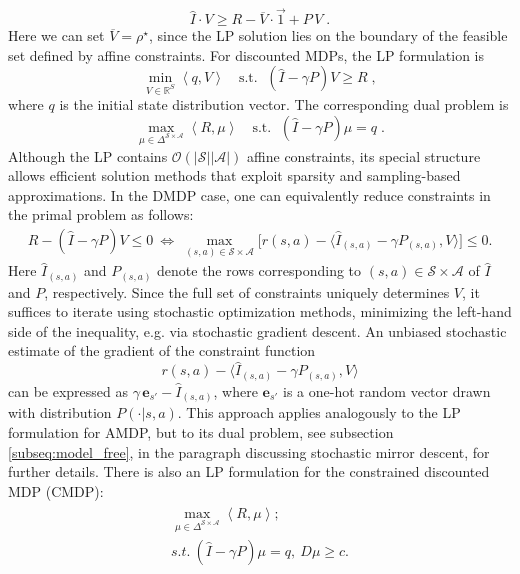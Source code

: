 \documentclass{article}
\numberwithin{equation}{section}
\newcommand{\eqsp}{\;}
\begin{document}
$$\widehat{I}\cdot V\geq R - \overline{V}\cdot\vec{1}+ P\, V\eqsp.$$
Here we can set $\overline{V} = \rho^{\star}$, since the LP solution lies on the boundary of the feasible set defined by affine constraints.
For discounted MDPs, the LP formulation is
\begin{equation}\label{eq:dual_dmpdp}
    \min\limits_{V\in\mathbb{R}^{S}}\left \langle q,V \right \rangle \quad \text{s.t. } \eqsp 
     (\widehat{I}-\gamma P)V\geq R\eqsp,
\end{equation}
where $q$ is the initial state distribution vector. The corresponding dual problem is
\begin{equation}
\max\limits_{\mu\in\Delta^{\mathcal{S}\times\mathcal{A}} }\left \langle R,\mu \right \rangle\quad \text{s.t. }\; (\widehat{I}-\gamma P)\mu=q\eqsp.
\end{equation}
Although the LP contains $\mathcal O(|\mathcal S||\mathcal A|)$ affine constraints, its special structure allows efficient solution methods that exploit sparsity and sampling-based approximations. In the DMDP case, one can equivalently reduce constraints in the primal problem as follows:
\begin{gather*}
    R-(\widehat{I}-\gamma P)V\leq0\ \Longleftrightarrow\ \max\limits_{(s,a)\in\mathcal{S}\times\mathcal{A}}\Big[r(s,a)- \big\langle \widehat{I}_{(s,a)}-\gamma P_{(s,a)},V \big\rangle\Big]\leq0.
\end{gather*}
Here $\widehat{I}_{(s,a)}$ and $P_{(s,a)}$ denote the rows corresponding to $(s,a)\in\mathcal{S}\times\mathcal{A}$ of $\widehat{I}$ and $P$, respectively. Since the full set of constraints uniquely determines $V$, it suffices to iterate using stochastic optimization methods, minimizing the left-hand side of the inequality, e.g. via stochastic gradient descent.  An unbiased stochastic estimate of the gradient of the constraint function
\[
r(s,a)- \big\langle \widehat{I}_{(s,a)}-\gamma P_{(s,a)},V\big\rangle
\]
can be expressed as {$\gamma \,\mathbf{e}_{s'} - \widehat{I}_{(s,a)}$}, where $\mathbf{e}_{s'}$ is a one-hot random vector drawn with distribution $P(\cdot | s,a)$. This approach applies analogously to the LP formulation for AMDP, but to its dual problem, see subsection \ref{subseq:model_free}, in the paragraph discussing stochastic mirror descent, for further details.
There is also an LP formulation for the constrained discounted MDP (CMDP):
\begin{gather*}
    \begin{matrix}
    \max\limits_{\mu\in\Delta^{\mathcal{S}\times\mathcal{A}} }\left \langle R,\mu \right \rangle;\\ 
    s.t.\ (\widehat{I}-\gamma P)\mu=q,\ D\mu\geq c.
    \end{matrix}
\end{gather*}
\end{document}

